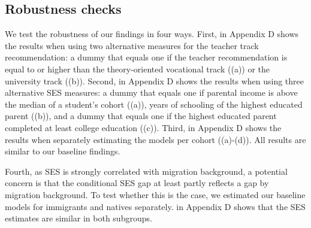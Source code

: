 \subsection{Robustness checks}

We test the robustness of our findings in four ways. First,  in Appendix D shows the results when using two alternative measures for the teacher track recommendation: a dummy that equals one if the teacher recommendation is equal to or higher than the theory-oriented vocational track ((a)) or the university track ((b)). Second,  in Appendix D shows the results when using three alternative SES measures: a dummy that equals one if parental income is above the median of a student's cohort ((a)), years of schooling of the highest educated parent ((b)), and a dummy that equals one if the highest educated parent completed at least college education ((c)). Third,  in Appendix D shows the results when separately estimating the models per cohort ((a)-(d)). All results are similar to our baseline findings.

Fourth, as SES is strongly correlated with migration background, a potential concern is that the conditional SES gap at least partly reflects a gap by migration background. To test whether this is the case, we estimated our baseline models for immigrants and natives separately.  in Appendix D shows that the SES estimates are similar in both subgroups.


